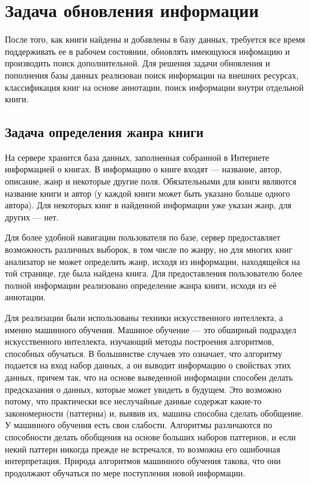 \section{Задача обновления информации}

После того, как книги найдены и добавлены в базу данных, требуется все время поддерживать ее в рабочем состоянии, обновлять имеющуюся инфомацию и производить поиск дополнительной. Для решения задачи обновления и пополнения базы данных реализован поиск информации на внешних ресурсах, классификация книг на основе аннотации, поиск информации внутри отдельной книги.

\subsection{Задача определения жанра книги}

На сервере хранится база данных, заполненная собранной в Интернете информацией о книгах. В информацию о книге входят --- название, автор, описание, жанр и некоторые другие поля. Обязательными для книги являются название книги и автор (у каждой книги может быть указано больше одного автора). Для некоторых книг в найденной информации уже указан жанр, для других --- нет. 

Для более удобной навигации пользователя по базе, сервер предоставляет возможность различных выборок, в том числе по жанру, но для многих книг анализатор не может определить жанр, исходя из информации, находящейся на той странице, где была найдена книга. Для предоставления пользователю более полной информации реализовано определение жанра книги, исходя из её аннотации. 

Для реализации были использованы техники искусственного интеллекта, а именно машинного обучения. Машиное обучение \cite{machine-learning} --- это обширный подраздел искусственного интеллекта, изучающий методы построения алгоритмов, способных обучаться. В большинстве случаев это означает, что алгоритму подается на вход набор данных, а он выводит информацию о свойствах этих данных, причем так, что на основе выведенной информации способен делать предсказания о данных, которые может увидеть в будущем. Это возможно потому, что практически все неслучайные данные содержат какие-то закономерности (паттерны) и, выявив их, машина способна сделать обобщение. У машинного обучения есть свои слабости. Алгоритмы различаются по способности делать обобщения на основе больших наборов паттернов, и если некий паттерн никогда прежде не встречался, то возможна его ошибочная интерпретация. Природа алгоритмов машинного обучения такова, что они продолжают обучаться по мере поступления новой информации.

